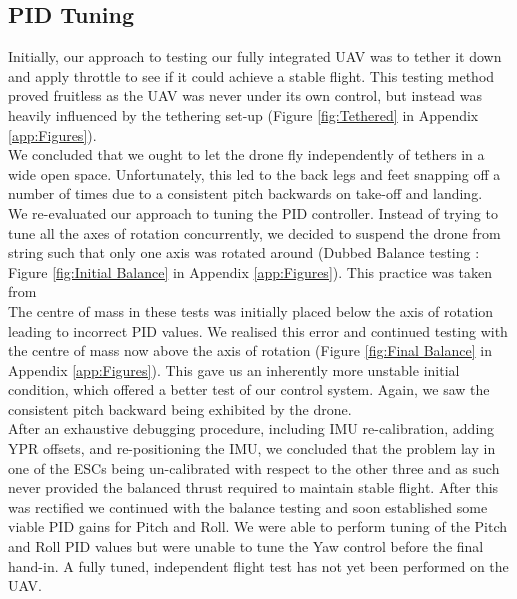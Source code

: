 \documentclass[a4paper,11pt]{article}
\begin{document}
\subsection{PID Tuning}
Initially, our approach to testing our fully integrated UAV was to tether it down and apply throttle to see if it could achieve a stable flight. This testing method proved fruitless as the UAV was never under its own control, but instead was heavily influenced by the tethering set-up (Figure \ref{fig:Tethered} in Appendix \ref{app:Figures}).\\
We concluded that we ought to let the drone fly independently of tethers in a wide open space. Unfortunately, this led to the back legs and feet snapping off a number of times due to a consistent pitch backwards on take-off and landing.\\ 
We re-evaluated our approach to tuning the PID controller. Instead of trying to tune all the axes of rotation concurrently, we decided to suspend the drone from string such that only one axis was rotated around (Dubbed Balance testing : Figure \ref{fig:Initial Balance} in Appendix \ref{app:Figures}). This practice was taken from \cite{How to recognise incorrect PI Gains}\\
The centre of mass in these tests was initially placed below the axis of rotation leading to incorrect PID values. We realised this error and continued testing with the centre of mass now above the axis of rotation (Figure \ref{fig:Final Balance} in Appendix \ref{app:Figures}). This gave us an inherently more unstable initial condition, which offered a better test of our control system. Again, we saw the consistent pitch backward being exhibited by the drone.\\ After an exhaustive debugging procedure, including IMU re-calibration, adding YPR offsets, and re-positioning the IMU, we concluded that the problem lay in one of the ESCs being un-calibrated with respect to the other three and as such never provided the balanced thrust required to maintain stable flight. After this was rectified we continued with the balance testing and soon established some viable PID gains for Pitch and Roll.
We were able to perform tuning of the Pitch and Roll PID values but were unable to tune the Yaw control before the final hand-in. A fully tuned, independent flight test has not yet been performed on the UAV.
    
\end{document}
